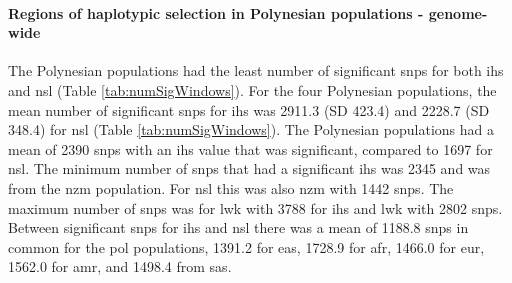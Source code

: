 \documentclass[]{report}
\let\oldparagraph\paragraph
\renewcommand{\paragraph}[1]{\oldparagraph{#1}\mbox{}}
\begin{document}
\paragraph{Regions of haplotypic selection in Polynesian populations -
genome-wide}\label{regions-of-haplotypic-selection-in-polynesian-populations---genome-wide}

The Polynesian populations had the least number of significant
\glspl{snp} for both \gls{ihs} and \gls{nsl} (Table
\ref{tab:numSigWindows}). For the four Polynesian populations, the mean
number of significant \glspl{snp} for \gls{ihs} was 2911.3 (SD 423.4)
and 2228.7 (SD 348.4) for \gls{nsl} (Table \ref{tab:numSigWindows}). The
Polynesian populations had a mean of 2390 \glspl{snp} with an \gls{ihs}
value that was significant, compared to 1697 for \gls{nsl}. The minimum
number of \glspl{snp} that had a significant \gls{ihs} was 2345 and was
from the \gls{nzm} population. For \gls{nsl} this was also \gls{nzm}
with 1442 \glspl{snp}. The maximum number of \glspl{snp} was for
\gls{lwk} with 3788 for \gls{ihs} and \gls{lwk} with 2802 \glspl{snp}.
Between significant \glspl{snp} for \gls{ihs} and \gls{nsl} there was a
mean of 1188.8 \glspl{snp} in common for the \gls{pol} populations,
1391.2 for \gls{eas}, 1728.9 for \gls{afr}, 1466.0 for \gls{eur}, 1562.0
for \gls{amr}, and 1498.4 from \gls{sas}.
\end{document}
